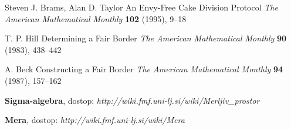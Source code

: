 \documentclass[a4paper, 12pt]{article}
\begin{document}
	\begin{thebibliography}{5}
		
		Steven J. Brams, Alan D. Taylor
		An Envy-Free Cake Division Protocol
		\textit{The American Mathematical Monthly} \textbf{102} (1995), 9–18
		
		T. P. Hill 
		Determining a Fair Border
		\textit{The American Mathematical Monthly} \textbf{90} (1983), 438–442
		
		A. Beck 
		Constructing a Fair Border
		\textit{The American Mathematical Monthly} \textbf{94} (1987), 157–162
		
		\textbf{Sigma-algebra}, dostop: \textit{http://wiki.fmf.uni-lj.si/wiki/Merljiv\_prostor}		
		
		\textbf{Mera}, dostop: \textit{http://wiki.fmf.uni-lj.si/wiki/Mera}
		
	\end{thebibliography}
	
\end{document}
